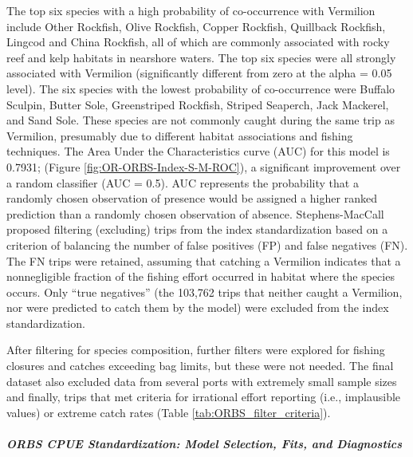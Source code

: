 \documentclass[11pt,
  english,
  a4paper,
]{article}
\begin{document}
The top six species with a high probability of co-occurrence with Vermilion include Other Rockfish, Olive Rockfish, Copper Rockfish, Quillback Rockfish, Lingcod and China Rockfish, all of which are commonly associated with rocky reef and kelp habitats in nearshore waters. The top six species were all strongly associated with Vermilion (significantly different from zero at the alpha = 0.05 level). The six species with the lowest probability of co-occurrence were Buffalo Sculpin, Butter Sole, Greenstriped Rockfish, Striped Seaperch, Jack Mackerel, and Sand Sole. These species are not commonly caught during the same trip as Vermilion, presumably due to different habitat associations and fishing techniques. The Area Under the Characteristics curve (AUC) for this model is 0.7931; (Figure \ref{fig:OR-ORBS-Index-S-M-ROC}), a significant improvement over a random classifier (AUC = 0.5). AUC represents the probability that a randomly chosen observation of presence would be assigned a higher ranked prediction than a randomly chosen observation of absence. Stephens-MacCall proposed filtering (excluding) trips from the index standardization based on a criterion of balancing the number of false positives (FP) and false negatives (FN). The FN trips were retained, assuming that catching a Vermilion indicates that a nonnegligible fraction of the fishing effort occurred in habitat where the species occurs. Only ``true negatives'' (the 103,762 trips that neither caught a Vermilion, nor were predicted to catch them by the model) were excluded from the index standardization.

\leavevmode\tagmcend\tagstructend\par


After filtering for species composition, further filters were explored for fishing closures and catches exceeding bag limits, but these were not needed. The final dataset also excluded data from several ports with extremely small sample sizes and finally, trips that met criteria for irrational effort reporting (i.e., implausible values) or extreme catch rates (Table \ref{tab:ORBS_filter_criteria}).

\leavevmode\tagmcend\tagstructend\par


\hypertarget{orbs-cpue-standardization-model-selection-fits-and-diagnostics}{%
\subparagraph{ORBS CPUE Standardization: Model Selection, Fits, and Diagnostics}\label{orbs-cpue-standardization-model-selection-fits-and-diagnostics}}
\end{document}
